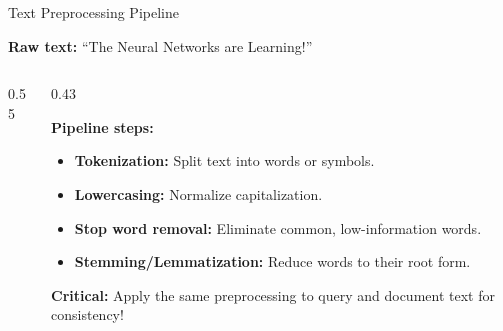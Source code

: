 \documentclass[aspectratio=169]{beamer}
\begin{document}
\begin{frame}[shrink=20]{Text Preprocessing Pipeline}

\textbf{Raw text:} ``The Neural Networks are Learning!''

\vspace{1em}

\begin{columns}[T,onlytextwidth]
\begin{column}{0.55\textwidth}



\end{column}
\hfill
\begin{column}{0.43\textwidth}

\textbf{Pipeline steps:}
\begin{itemize}
    \item \textbf{Tokenization:} Split text into words or symbols.
    \item \textbf{Lowercasing:} Normalize capitalization.
    \item \textbf{Stop word removal:} Eliminate common, low-information words.
    \item \textbf{Stemming/Lemmatization:} Reduce words to their root form.
\end{itemize}

\vspace{0.5em}
\textbf{Critical:} Apply the same preprocessing to query and document text for consistency!

\end{column}
\end{columns}

\end{frame}
\end{document}
